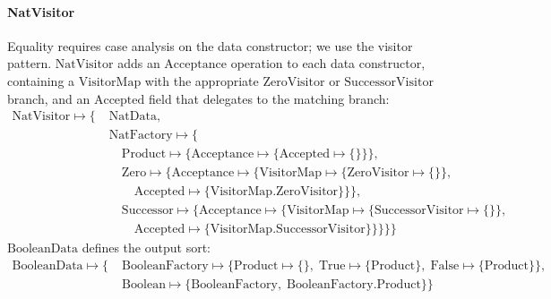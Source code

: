 \paragraph{NatVisitor}
Equality requires case analysis on the data constructor; we use the
visitor pattern.
$\mathrm{NatVisitor}$ adds an $\mathrm{Acceptance}$ operation to each data constructor,
containing a $\mathrm{VisitorMap}$ with the appropriate
$\mathrm{ZeroVisitor}$ or $\mathrm{SuccessorVisitor}$ branch,
and an $\mathrm{Accepted}$ field that delegates to the matching branch:
\begin{align*}
  \mathrm{NatVisitor} \mapsto \{\;&
    \mathrm{NatData},\\
    &\mathrm{NatFactory} \mapsto \{\\
      &\quad \mathrm{Product} \mapsto \{\mathrm{Acceptance} \mapsto \{
      \mathrm{Accepted} \mapsto \{\}\}\},\\[2pt]
      &\quad \mathrm{Zero} \mapsto \{\mathrm{Acceptance} \mapsto \{
          \mathrm{VisitorMap} \mapsto \{
          \mathrm{ZeroVisitor} \mapsto \{\}\},\\
          &\qquad
      \mathrm{Accepted} \mapsto \{\mathrm{VisitorMap}.\mathrm{ZeroVisitor}\}\}\},\\[2pt]
      &\quad \mathrm{Successor} \mapsto \{\mathrm{Acceptance} \mapsto \{
          \mathrm{VisitorMap} \mapsto \{
          \mathrm{SuccessorVisitor} \mapsto \{\}\},\\
          &\qquad
  \mathrm{Accepted} \mapsto \{\mathrm{VisitorMap}.\mathrm{SuccessorVisitor}\}\}\}\}\}
\end{align*}
$\mathrm{BooleanData}$ defines the output sort:
\begin{align*}
  \mathrm{BooleanData} \mapsto \{\;&
    \mathrm{BooleanFactory} \mapsto \{
      \mathrm{Product} \mapsto \{\},\;
      \mathrm{True} \mapsto \{\mathrm{Product}\},\;
    \mathrm{False} \mapsto \{\mathrm{Product}\}\},\\
    &\mathrm{Boolean} \mapsto \{\mathrm{BooleanFactory},\;
  \mathrm{BooleanFactory}.\mathrm{Product}\}\}
\end{align*}
